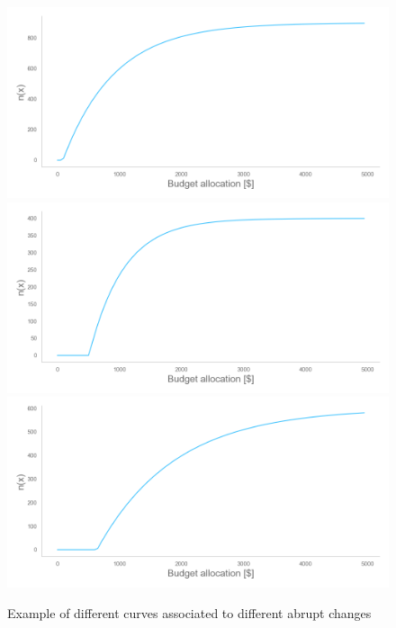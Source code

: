 \begin{figure}[!htb]
    \centering

    \includegraphics[width=\linewidth]{images/phase0.png}
    \endminipage\hfill
    \includegraphics[width=\linewidth]{images/phase1.png}
    \endminipage\hfill
    \includegraphics[width=\linewidth]{images/phase2.png}
    \endminipage\hfill

    \caption{Example of different curves associated to different abrupt changes}
    \label{abruptFigure}
\end{figure}


